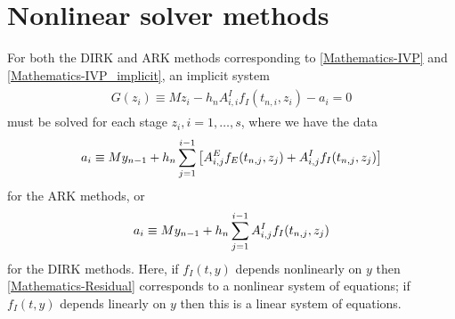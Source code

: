 \documentclass[letterpaper,10pt,english]{sphinxmanual}
\begin{document}
\section{Nonlinear solver methods}
\label{Mathematics:nonlinear-solver-methods}\label{Mathematics:mathematics-nonlinear}
For both the DIRK and ARK methods corresponding to \eqref{Mathematics-IVP} and
\eqref{Mathematics-IVP_implicit}, an implicit system
\label{Mathematics:equation-Residual}\begin{gather}
\begin{split}G(z_i) \equiv M z_i - h_n A^I_{i,i} f_I(t_{n,i}, z_i) - a_i = 0\end{split}\label{Mathematics-Residual}
\end{gather}
must be solved for each stage \(z_i, i=1,\ldots,s\), where we have
the data
\begin{gather}
\begin{split}a_i \equiv M y_{n-1} + h_n \sum_{j=1}^{i-1} \left[
   A^E_{i,j} f_E(t_{n,j}, z_j) +
   A^I_{i,j} f_I(t_{n,j}, z_j) \right]\end{split}\notag
\end{gather}
for the ARK methods, or
\begin{gather}
\begin{split}a_i \equiv M y_{n-1} + h_n \sum_{j=1}^{i-1}
   A^I_{i,j} f_I(t_{n,j}, z_j)\end{split}\notag
\end{gather}
for the DIRK methods.  Here, if \(f_I(t,y)\) depends nonlinearly
on \(y\) then \eqref{Mathematics-Residual} corresponds to a nonlinear system of
equations; if \(f_I(t,y)\) depends linearly on \(y\) then this
is a linear system of equations.
\end{document}
